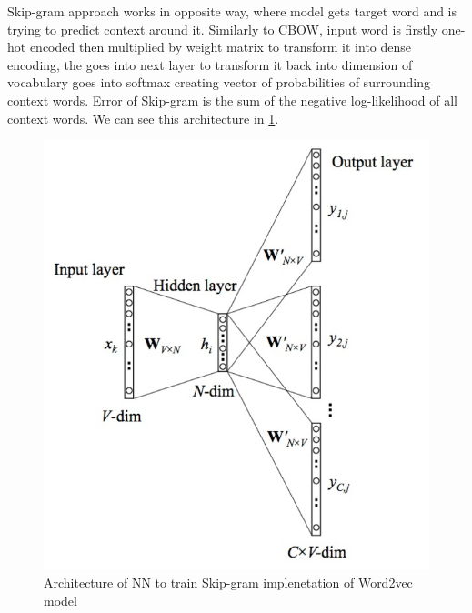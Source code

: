 Skip-gram approach works in opposite way, where model gets target word and is trying to predict context around it. Similarly to CBOW, input word is firstly one-hot encoded then multiplied by weight matrix to transform it into dense encoding, the goes into next layer to transform it back into dimension of vocabulary goes into softmax creating vector of probabilities of surrounding context words. Error of Skip-gram is the sum of the negative log-likelihood of all context words. We can see this architecture in \ref{fig:skip_arch}.

\begin{figure}[!h]
	\centering
	
	\includegraphics[width=1\textwidth]{images/Skip_arch.png}
	
	\caption{Architecture of NN to train Skip-gram implenetation of Word2vec model \cite{skipgram}}
	\label{fig:skip_arch}
\end{figure}
